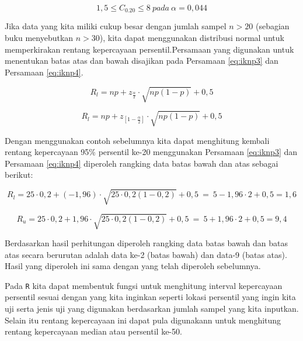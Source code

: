 \documentclass[]{book}
\begin{document}
\[
1,5\le C_{0.20}\le8\ pada\ \alpha=0,044
\]

Jika data yang kita miliki cukup besar dengan jumlah sampel \(n>20\)
(sebagian buku menyebutkan \(n>30\)), kita dapat menggunakan distribusi
normal untuk memperkirakan rentang kepercayaan persentil.Persamaan yang
digunakan untuk menentukan batas atas dan bawah disajikan pada Persamaan
\eqref{eq:iknp3} dan Persamaan \eqref{eq:iknp4}.

\begin{equation}
  R_l=np+z_{\frac{\alpha}{2}}\cdot\sqrt{np\left(1-p\right)}+0,5
  \label{eq:iknp3}
\end{equation}

\begin{equation}
  R_l=np+z_{\left[1-\frac{\alpha}{2}\right]}\cdot\sqrt{np\left(1-p\right)}+0,5
  \label{eq:iknp4}
\end{equation}

Dengan menggunakan contoh sebelumnya kita dapat menghitung kembali
rentang kepercayaan 95\% persentil ke-20 menggunakan Persamaan
\eqref{eq:iknp3} dan Persamaan \eqref{eq:iknp4} diperoleh rangking data
batas bawah dan atas sebagai berikut:

\[
R_l=25\cdot0,2+\left(-1,96\right)\cdot\sqrt{25\cdot0,2\left(1-0,2\right)}+0,5\ =\ 5-1,96\cdot2+0,5=1,6
\]

\[
R_u=25\cdot0,2+1,96\cdot\sqrt{25\cdot0,2\left(1-0,2\right)}+0,5\ =\ 5+1,96\cdot2+0,5=9,4
\]

Berdasarkan hasil perhitungan diperoleh rangking data batas bawah dan
batas atas secara berurutan adalah data ke-2 (batas bawah) dan data-9
(batas atas). Hasil yang diperoleh ini sama dengan yang telah diperoleh
sebelumnya.

Pada \texttt{R} kita dapat membentuk fungsi untuk menghitung interval
kepercayaan persentil sesuai dengan yang kita inginkan seperti lokasi
persentil yang ingin kita uji serta jenis uji yang digunakan berdasarkan
jumlah sampel yang kita inputkan. Selain itu rentang kepercayaan ini
dapat pula digunakann untuk menghitung rentang kepercayaan median atau
persentil ke-50.
\end{document}
